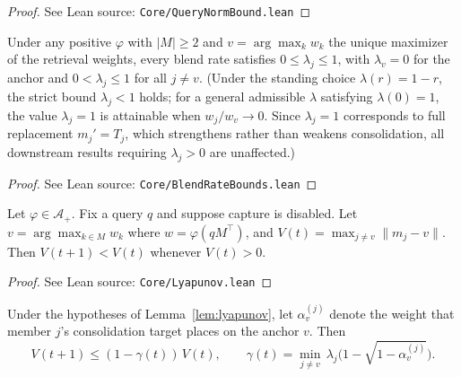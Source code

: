 \begin{proof}
\leanok
{}
See Lean source: \texttt{Core/QueryNormBound.lean}
\end{proof}

\begin{corollary}
\label{cor:blend_rate_bounds}
\leanok
{}
Under any positive $\varphi$ with $|M| \geq 2$ and $v = \arg\max_k w_k$ the unique maximizer of the retrieval weights, every blend rate satisfies $0 \leq \lambda_j \leq 1$, with $\lambda_v = 0$ for the anchor and $0 < \lambda_j \leq 1$ for all $j \neq v$.  (Under the standing choice $\lambda(r) = 1 - r$, the strict bound $\lambda_j < 1$ holds; for a general admissible $\lambda$ satisfying $\lambda(0) = 1$, the value $\lambda_j = 1$ is attainable when $w_j/w_v \to 0$.  Since $\lambda_j = 1$ corresponds to full replacement $m_j' = T_j$, which strengthens rather than weakens consolidation, all downstream results requiring $\lambda_j > 0$ are unaffected.)
\end{corollary}

\begin{proof}
\leanok
{}
See Lean source: \texttt{Core/BlendRateBounds.lean}
\end{proof}

\begin{lemma}
\label{lem:lyapunov}
\leanok
{}
Let $\varphi \in \mathcal{A}_+$.  Fix a query $q$ and suppose capture is disabled. Let $v = \arg\max_{k \in M} w_k$ where $w = \varphi(qM^\top)$, and $V(t) = \max_{j \neq v} \|m_j - v\|$. Then $V(t+1) < V(t)$ whenever $V(t) > 0$.
\end{lemma}

\begin{proof}
\leanok
{}
See Lean source: \texttt{Core/Lyapunov.lean}
\end{proof}

\begin{corollary}
\label{cor:contraction}
\leanok
{}
Under the hypotheses of Lemma~\ref{lem:lyapunov}, let $\alpha_v^{(j)}$ denote the weight that member $j$'s consolidation target places on the anchor $v$. Then
\[
V(t+1) \leq (1 - \gamma(t))\,V(t), \qquad \gamma(t) = \min_{j \neq v}\,\lambda_j\bigl(1 - \sqrt{1 - \alpha_v^{(j)}}\bigr).
\]
\end{corollary}

